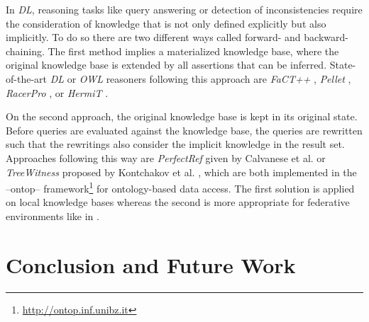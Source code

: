 \documentclass{acm_proc_article-sp}
\begin{document}
In \emph{DL}, reasoning tasks like query answering or detection of inconsistencies require the consideration of knowledge that is not only defined explicitly but also implicitly. To do so there are two different ways called forward- and backward-chaining. 
The first method implies a materialized knowledge base, where the original knowledge base is extended by all assertions that can be inferred. State-of-the-art \emph{DL} or \emph{OWL} reasoners following this approach are \emph{FaCT++} \cite{tsarkov2006fact++}, \emph{Pellet} \cite{sirin2007pellet},  \emph{RacerPro} \cite{haarslev2001racer}, or \emph{HermiT} \cite{horrocks2012hermit}. 

On the second approach, the original knowledge base is kept in its original state.
Before queries are evaluated against the knowledge base, the queries are rewritten such that the rewritings also consider the implicit knowledge in the result set. 
Approaches following this way are \emph{PerfectRef} given by Calvanese et al. \cite{Calvanese2007} or \emph{TreeWitness} proposed by Kontchakov et al. \cite{kontchakov2011combined}, which are both implemented in the --ontop-- framework\footnote{\url{http://ontop.inf.unibz.it}} for ontology-based data access. 
The first solution is applied on local knowledge bases whereas the second is more appropriate for federative environments like in \cite{nolle2014efficient,nolle2013elite}. 



%

\section{Conclusion and Future Work}

\end{document}
